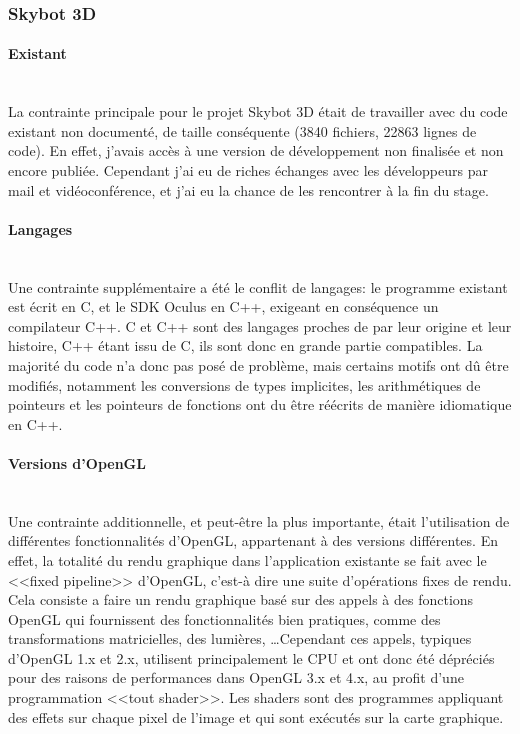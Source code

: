 \documentclass[a4paper,french,12pt]{article}
\begin{document}
	\subsubsection{Skybot 3D}
	    \paragraph{Existant} ~\\
	    
		La contrainte principale pour le projet Skybot 3D était de travailler avec du code existant non documenté,
		de taille conséquente (3840 fichiers, 22863 lignes de code).
		En effet, j'avais accès à une version de développement non finalisée et non encore publiée. Cependant j'ai 
		eu de riches échanges avec les développeurs par mail et vidéoconférence, et j'ai eu la chance
		de les rencontrer à la fin du stage.
		
	    \paragraph{Langages} ~\\
	      
		Une contrainte supplémentaire a été le conflit de langages: le programme existant est écrit en C, et le
		SDK Oculus en C++, exigeant en conséquence un compilateur C++. 
		C et C++ sont des langages proches de par leur origine et leur histoire, C++ étant issu de C, 
		ils sont donc en grande partie compatibles. La majorité du code n'a donc pas posé de problème, 
		mais certains motifs ont dû être modifiés, notamment les conversions de types implicites,
		les arithmétiques de pointeurs et les pointeurs de fonctions ont du être réécrits de manière
		idiomatique en C++.
		
	    \paragraph{Versions d'OpenGL} ~\\
	    
		Une contrainte additionnelle, et peut-être la plus importante, était l'utilisation de différentes 
		fonctionnalités d'OpenGL, appartenant à des versions différentes.
		En effet, la totalité du rendu graphique dans l'application existante se fait avec le <<fixed pipeline>> 
		d'OpenGL, c'est-à dire une suite d'opérations fixes de rendu. Cela consiste a faire un rendu graphique basé sur des
		appels à des fonctions OpenGL qui fournissent des fonctionnalités bien pratiques, comme des transformations
		matricielles, des lumières, \ldots Cependant ces appels, typiques d'OpenGL 1.x et 2.x, 
		utilisent principalement le CPU et ont donc
		été dépréciés pour des raisons de performances dans OpenGL 3.x et 4.x, au profit d'une programmation
		<<tout shader>>. Les shaders sont des programmes appliquant des effets sur chaque pixel de l'image et qui
		sont exécutés sur la carte graphique.
		
\end{document}

